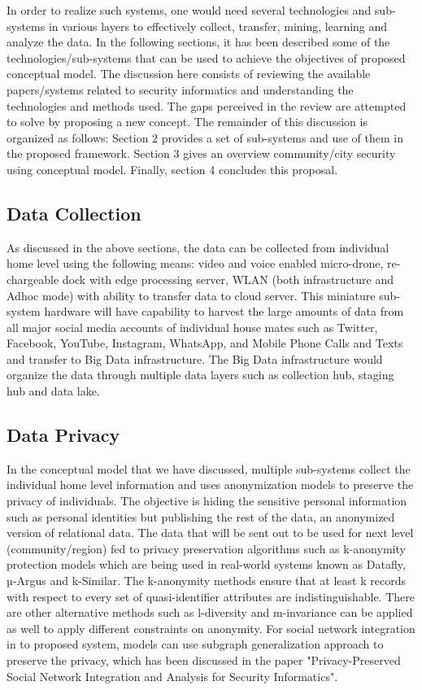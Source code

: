 \documentclass[sigconf]{acmart}
\begin{document}
In order to realize such systems, one would need several technologies and sub-systems in various layers to effectively collect, transfer, mining, learning and analyze the data. In the following sections, it has been described some of the technologies/sub-systems that can be used to achieve the objectives of proposed conceptual model.
The discussion here consists of reviewing the available papers/systems related to security informatics and understanding the technologies and methods used. The gaps perceived in the review are attempted to solve by proposing a new concept. The remainder of this discussion is organized as follows: Section 2 provides a set of sub-systems and use of them in the proposed framework. Section 3 gives an overview community/city security using conceptual model. Finally, section 4 concludes this proposal.

\subsection{Data Collection}
As discussed in the above sections, the data can be collected from individual home level using the following means: video and voice enabled micro-drone, re-chargeable dock with edge processing server, WLAN (both infrastructure and Adhoc mode) with ability to transfer data to cloud server. This miniature sub-system hardware will have capability to harvest the large amounts of data from all major social media accounts of individual house mates such as Twitter, Facebook, YouTube, Instagram, WhatsApp, and Mobile Phone Calls and Texts and transfer to Big Data infrastructure. The Big Data infrastructure would organize the data through multiple data layers such as collection hub, staging hub and data lake.

\subsection{Data Privacy}
In the conceptual model that we have discussed, multiple sub-systems collect the individual home level information and uses anonymization models to preserve the privacy of individuals. The objective is hiding the sensitive personal information such as personal identities but publishing the rest of the data, an anonymized version of relational data. The data that will be sent out to be used for next level (community/region) fed to privacy preservation algorithms such as k-anonymity protection models which are being used in real-world systems known as Datafly, µ-Argus and k-Similar. The k-anonymity methods ensure that at least k records with respect to every set of quasi-identifier attributes are indistinguishable. There are other alternative methods such as l-diversity and m-invariance can be applied as well to apply different constraints on anonymity. For social network integration in to proposed system, models can use subgraph generalization approach to preserve the privacy, which has been discussed in the paper "Privacy-Preserved Social Network Integration and Analysis for Security Informatics"\cite{Yang2010}.
\end{document}
